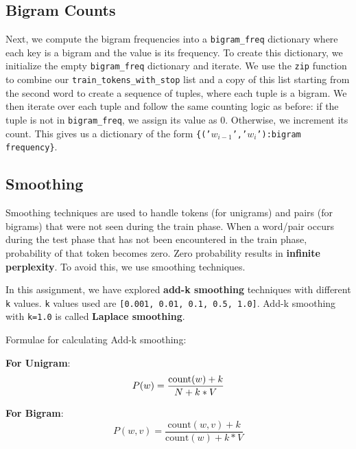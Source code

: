 \documentclass[a4paper]{article}
\begin{document}
\subsection{Bigram Counts}
Next, we compute the bigram frequencies into a \texttt{bigram\_freq} dictionary where each key is a bigram and the value is its frequency. To create this dictionary, we initialize the empty \texttt{bigram\_freq} dictionary and iterate. We use the \texttt{zip} function to combine our \texttt{train\_tokens\_with\_stop} list and a copy of this list starting from the second word to create a sequence of tuples, where each tuple is a bigram. We then iterate over each tuple and follow the same counting logic as before: if the tuple is not in \texttt{bigram\_freq}, we assign its value as 0. Otherwise, we increment its count. This gives us a dictionary of the form \texttt{\{('$w_{i-1}$','$w_i$'):bigram frequency\}}.

\subsection{Smoothing}
Smoothing techniques are used to handle tokens (for unigrams) and pairs (for bigrams) that were not seen during the train phase. When a word/pair occurs during the test phase that has not been encountered in the train phase, probability of that token becomes zero. Zero probability results in \textbf{infinite perplexity}. To avoid this, we use smoothing techniques.
 
In this assignment, we have explored \textbf{add-k smoothing} techniques with different \texttt{k} values. \texttt{k} values used are \texttt{[0.001, 0.01, 0.1, 0.5, 1.0]}. Add-k smoothing with \texttt{k=1.0} is called \textbf{Laplace smoothing}.
 
Formulae for calculating Add-k smoothing:
 
\textbf{For Unigram}: $$ P(w) = \frac{\text{count}(w) + k}{N + k * V} \\[1em] $$
 
\textbf{For Bigram}: $$ P(w, v) = \frac{\text{count}(w, v) + k}{\text{count}(w) + k * V} $$
 
\end{document}
